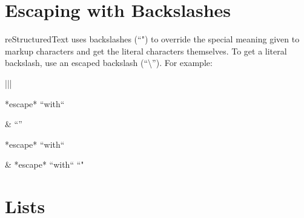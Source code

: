 \documentclass[letterpaper,10pt,english]{sphinxmanual}
\begin{document}
\section{Escaping with Backslashes}
\label{\detokenize{rst-cheatsheet/rst-cheatsheet:escaping-with-backslashes}}
reStructuredText uses backslashes (“") to override the special meaning given to markup characters and get
the literal characters themselves. To get a literal backslash, use an escaped backslash (“\textbackslash{}”). For example:


\begin{savenotes}\sphinxattablestart
\centering
\begin{tabular}[t]{|*{2}{|}}
\hline

\begin{sphinxVerbatimintable}[commandchars=\\\{\}]
*escape* ``with`` \PYGZdq{}\PYGZbs{}\PYGZdq{}
\end{sphinxVerbatimintable}
&
  “”
\\
\hline
\begin{sphinxVerbatimintable}[commandchars=\\\{\}]
\PYGZbs{}*escape* \PYGZbs{}``with`` \PYGZdq{}\PYGZbs{}\PYGZbs{}\PYGZdq{}
\end{sphinxVerbatimintable}
&
*escape* ``with`` “"
\\
\hline
\end{tabular}
\par
\sphinxattableend\end{savenotes}


\section{Lists}
\label{\detokenize{rst-cheatsheet/rst-cheatsheet:lists}}
\end{document}
